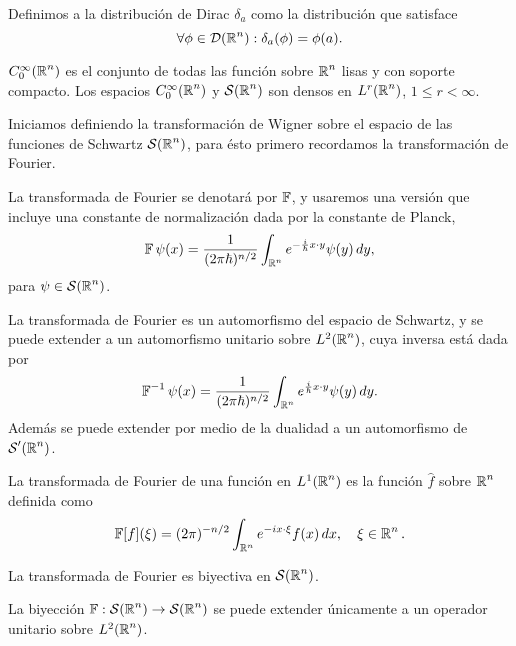   \begin{definition}
    Definimos a la distribución de Dirac $\delta_a$ como la
    distribución que satisface
    \[
      \forall \phi \in \mathcal D(\operatorname{\mathbb{R}}^{n}) : \delta_a(\phi) =
      \phi(a).
    \] 
  \end{definition}

  $C^{\infty}_0(\operatorname{\mathbb{R}}^{n})$ es el conjunto de todas las función
  sobre $\operatorname{\mathbb{R}}^{n}$ lisas y con soporte compacto. Los espacios
  $C^{\infty}_0(\operatorname{\mathbb{R}}^{n})$ y $\operatorname{\mathcal S}(\operatorname{\mathbb{R}}^{n})$ son densos en
  $L^{r}(\operatorname{\mathbb{R}}^{n})$, $1 \leq r < \infty$.

  Iniciamos definiendo
  la transformación de Wigner sobre el espacio de las
  funciones de Schwartz $\operatorname{\mathcal S}(\operatorname{\mathbb{R}}^{n})$, para ésto primero
  recordamos la transformación de Fourier.

  \begin{definition}
    La transformada de Fourier se denotará por $\operatorname{\mathbb{F}}$,
    y usaremos una versión que incluye una constante de
    normalización dada por la constante de Planck,
    \[
      \operatorname{\mathbb{F}}\psi(x)
      = \frac{1}{(2\pi\hbar)^{n / 2}} \int_{\operatorname{\mathbb{R}}^{n}}
      e^{-\frac{i}{\hbar} x \cdot y} \psi(y) \, dy,
    \] 
    para $\psi \in \operatorname{\mathcal S}(\operatorname{\mathbb{R}}^{n})$.
  \end{definition}
  La transformada de Fourier es un automorfismo del espacio
  de Schwartz, y se puede extender a un automorfismo
  unitario sobre $L^2(\operatorname{\mathbb{R}}^{n})$, cuya inversa está dada por
  \[
    \operatorname{\mathbb{F}}^{-1}\psi(x)
    = \frac{1}{(2\pi\hbar)^{n / 2}} \int_{\operatorname{\mathbb{R}}^{n}}
    e^{\frac{i}{\hbar} x \cdot y} \psi(y) \, dy.
  \] 
  Además se puede extender por medio de la dualidad a un
  automorfismo de $\operatorname{\mathcal S}'(\operatorname{\mathbb{R}}^{n})$.

  \begin{definition}
    La transformada de Fourier de una función en
    $L^{1}(\operatorname{\mathbb{R}}^{n})$ es la función $\hat{f}$ sobre $\operatorname{\mathbb{R}}^{n}$ 
    definida como
    \[
      \operatorname{\mathbb{F}}[f](\xi) = (2\pi)^{-n / 2} \int_{\operatorname{\mathbb{R}}^{n}} e^{-i x
      \cdot \xi} f(x) \, dx, 
      \quad \xi \in \operatorname{\mathbb{R}}^{n}.
    \] 
  \end{definition}

  \begin{theorem}
    La transformada de Fourier es biyectiva en
    $\operatorname{\mathcal S}(\operatorname{\mathbb{R}}^{n})$.
  \end{theorem}

  \begin{theorem}[Plancherel]
    La biyección $\operatorname{\mathbb{F}} : \operatorname{\mathcal S}(\operatorname{\mathbb{R}}^{n}) \to \operatorname{\mathcal S}(\operatorname{\mathbb{R}}^{n})$ 
    se puede extender únicamente a un operador unitario
    sobre $L^2(\operatorname{\mathbb{R}}^{n})$.
  \end{theorem}


